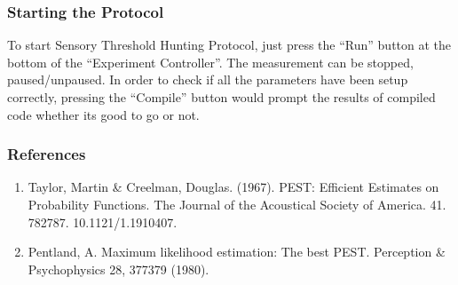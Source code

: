 \documentclass[letterpaper,10pt,english]{sphinxmanual}
\begin{document}
\subsubsection{Starting the Protocol}
\label{\detokenize{15_SensoryThresholdHunting:starting-the-protocol}}
\sphinxAtStartPar
To start Sensory Threshold Hunting Protocol, just press the “Run” button at the bottom of the “Experiment Controller”. The measurement can be stopped, paused/unpaused. In order to check if all the parameters have been setup correctly, pressing the “Compile” button would prompt the results of compiled code whether its good to go or not.


\subsubsection{References}
\label{\detokenize{15_SensoryThresholdHunting:references}}\begin{enumerate}
%
\item {} 
\sphinxAtStartPar
Taylor, Martin \& Creelman, Douglas. (1967). PEST: Efficient Estimates on Probability Functions. The Journal of the Acoustical Society of America. 41. 782\sphinxhyphen{}787. 10.1121/1.1910407.

\item {} 
\sphinxAtStartPar
Pentland, A. Maximum likelihood estimation: The best PEST. Perception \& Psychophysics 28, 377\textendash{}379 (1980). 

\end{enumerate}



\renewcommand{\indexname}{Index}
\printindex
\end{document}

